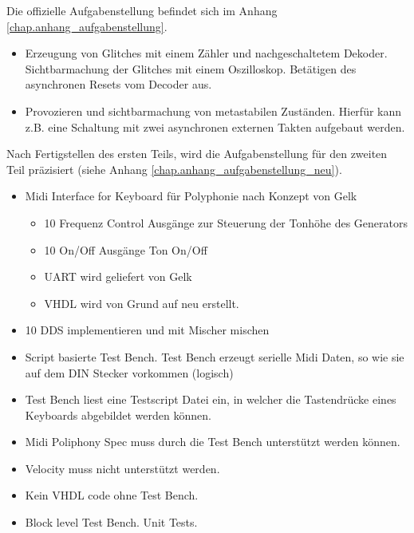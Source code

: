 Die offizielle Aufgabenstellung befindet sich im Anhang \ref{chap.anhang_aufgabenstellung}. 
 
\begin{itemize}
	\item Erzeugung von Glitches mit einem Zähler und nachgeschaltetem Dekoder. Sichtbarmachung der Glitches mit einem Oszilloskop. Betätigen des asynchronen Resets vom Decoder aus.
	\item Provozieren und sichtbarmachung von metastabilen Zuständen. Hierfür kann z.B. eine Schaltung mit zwei asynchronen externen Takten aufgebaut werden.
\end{itemize}  


Nach Fertigstellen des ersten Teils, wird die Aufgabenstellung für den zweiten Teil präzisiert (siehe Anhang \ref{chap.anhang_aufgabenstellung_neu}).

\begin{itemize}
	\item Midi Interface for Keyboard für Polyphonie nach Konzept von Gelk
	\begin{itemize}
    	\item 10 Frequenz Control Ausgänge zur Steuerung der Tonhöhe des Generators
    	\item 10 On/Off Ausgänge Ton On/Off
    	\item UART wird geliefert von Gelk
   	 	\item VHDL wird von Grund auf neu erstellt.
	\end{itemize}
	\item 10 DDS implementieren und mit Mischer mischen
	\item Script basierte Test Bench. Test Bench erzeugt serielle Midi Daten, so wie sie auf dem DIN Stecker vorkommen (logisch)
	\item Test Bench liest eine Testscript Datei ein, in welcher die Tastendrücke eines Keyboards abgebildet werden können. 
	\item Midi Poliphony Spec muss durch die Test Bench unterstützt werden können. 
	\item Velocity muss nicht unterstützt werden.
	\item Kein VHDL code ohne Test Bench.
	\item Block level Test Bench. Unit Tests.
\end{itemize}

